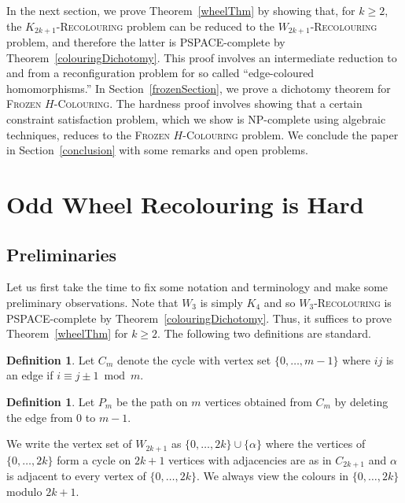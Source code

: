 \documentclass[11 pt]{amsart}
\theoremstyle{definition}
\newtheorem{defn}[equation]{Definition}
\theoremstyle{case}
\numberwithin{equation}{section}
\newcommand\Hfrz[1]{\textsc{Frozen $#1$-Colouring}}
\newcommand\Hrec[1]{\textsc{$#1$-Recolouring}}
\begin{document}
In the next section, we prove Theorem~\ref{wheelThm} by showing that, for $k\geq2$, the \Hrec{K_{2k+1}} problem can be reduced to the \Hrec{W_{2k+1}} problem, and therefore the latter is PSPACE-complete by Theorem~\ref{colouringDichotomy}. This proof involves an intermediate reduction to and from a reconfiguration problem for so called ``edge-coloured homomorphisms.'' In Section~\ref{frozenSection}, we prove a dichotomy theorem for \Hfrz{H}. The hardness proof involves showing that a certain constraint satisfaction problem, which we show is NP-complete using algebraic techniques,  reduces to the \Hfrz{H} problem. We conclude the paper in Section~\ref{conclusion} with some remarks and open problems. 

\section{Odd Wheel Recolouring is Hard}
\label{wheelsSec}



\subsection{Preliminaries}
Let us first take the time to fix some notation and terminology and make some preliminary observations. Note that $W_3$ is simply $K_4$ and so  \Hrec{W_3} is PSPACE-complete by Theorem~\ref{colouringDichotomy}. Thus, it suffices to prove Theorem~\ref{wheelThm} for $k\geq2$. The following two definitions are standard. 

\begin{defn}
Let $C_m$ denote the cycle with vertex set $\{0,\dots,m-1\}$ where $ij$ is an edge if $i\equiv j\pm1\bmod m$.
\end{defn}

\begin{defn}
Let $P_m$ be the path on $m$ vertices obtained from $C_m$ by deleting the edge from $0$ to $m-1$. 
\end{defn}

We write the vertex set of $W_{2k+1}$ as $\{0,\dots, 2k\}\cup\{\alpha\}$ where the vertices of $\{0,\dots,2k\}$ form a cycle on $2k+1$ vertices with adjacencies are as in $C_{2k+1}$ and $\alpha$ is adjacent to every vertex of $\{0,\dots,2k\}$. We always view the colours in $\{0,\dots,2k\}$ modulo $2k+1$. 
\end{document}
